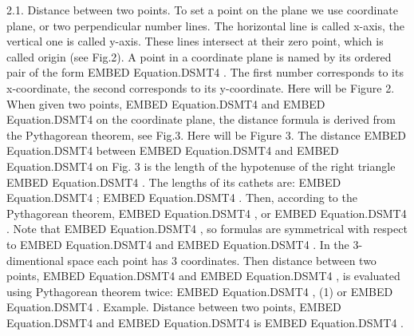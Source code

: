\documentclass{article}
\begin{document}
2.1. Distance between two points.
To set a point on the plane we use coordinate plane, or two perpendicular number lines.
The horizontal line is called x-axis, the vertical one is called y-axis.
These lines intersect at their zero point, which is called origin (see Fig.2).
A point in a coordinate plane is named by its ordered pair of the form  EMBED Equation.DSMT4  .
The first number corresponds to its x-coordinate, the second corresponds to its y-coordinate.
Here will be Figure 2.
When given two points,  EMBED Equation.DSMT4   and  EMBED Equation.DSMT4   on the coordinate plane, the distance formula is derived from the Pythagorean theorem, see Fig.3.
Here will be Figure 3.
The distance  EMBED Equation.DSMT4   between  EMBED Equation.DSMT4   and  EMBED Equation.DSMT4   on Fig. 3 is the length of the hypotenuse of the right triangle EMBED Equation.DSMT4  .
The lengths of its cathets are:  EMBED Equation.DSMT4  ;  EMBED Equation.DSMT4  . Then, according to the Pythagorean theorem,
 EMBED Equation.DSMT4  ,
or
 EMBED Equation.DSMT4  .
Note that  EMBED Equation.DSMT4  , so formulas are symmetrical with respect to  EMBED Equation.DSMT4   and  EMBED Equation.DSMT4  .
In the 3-dimentional space each point has 3 coordinates.
Then distance between two points,  EMBED Equation.DSMT4   and  EMBED Equation.DSMT4  , is evaluated using Pythagorean theorem twice:
 EMBED Equation.DSMT4  ,                                     (1)
or
 EMBED Equation.DSMT4  .
Example.
Distance between two points,  EMBED Equation.DSMT4   and  EMBED Equation.DSMT4   is
 EMBED Equation.DSMT4  .
\end{document}
